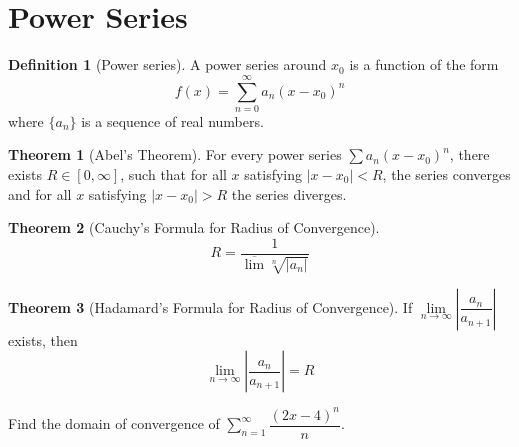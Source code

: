 \documentclass[fleqn, a4paper, 12pt, twoside]{article}
\theoremstyle{definition}
\newtheorem{definition}{Definition}
\theoremstyle{theorem}
\newtheorem{theorem}{Theorem}
\begin{document}
\section{Power Series}

\begin{definition}[Power series]
	A power series around $x_0$ is a function of the form
	\begin{equation*}
		f(x) = \sum_{n = 0}^{\infty} a_n (x - x_0)^n
	\end{equation*}
	where $\{a_n\}$ is a sequence of real numbers.
\end{definition}

\begin{theorem}[Abel's Theorem]
	For every power series $\sum a_n (x - x_0)^n$, there exists $R \in [0,\infty]$, such that for all $x$ satisfying $|x - x_0| < R$, the series converges and for all $x$ satisfying $|x - x_0| > R$ the series diverges.
	\label{Abel's_Theorem}
\end{theorem}

\begin{theorem}[Cauchy's Formula for Radius of Convergence]
	\begin{equation*}
		R = \dfrac{1}{\overline{\lim} \sqrt[n]{|a_n|}}
	\end{equation*}
	\label{Cauchy's_Formula_for_Radius_of_Convergence}
\end{theorem}

\begin{theorem}[Hadamard's Formula for Radius of Convergence]
	If $\lim\limits_{n \to \infty} \left| \dfrac{a_n}{a_{n + 1}} \right|$ exists, then
	\begin{equation*}
		\lim\limits_{n \to \infty} \left| \dfrac{a_n}{a_{n + 1}} \right| = R
	\end{equation*}
	\label{Hadamard's_Formula_for_Radius_of_Convergence}
\end{theorem}

\begin{question}
	Find the domain of convergence of $\sum\limits_{n = 1}^{\infty} \dfrac{(2x - 4)^n}{n}$.
\end{question}
\end{document}
